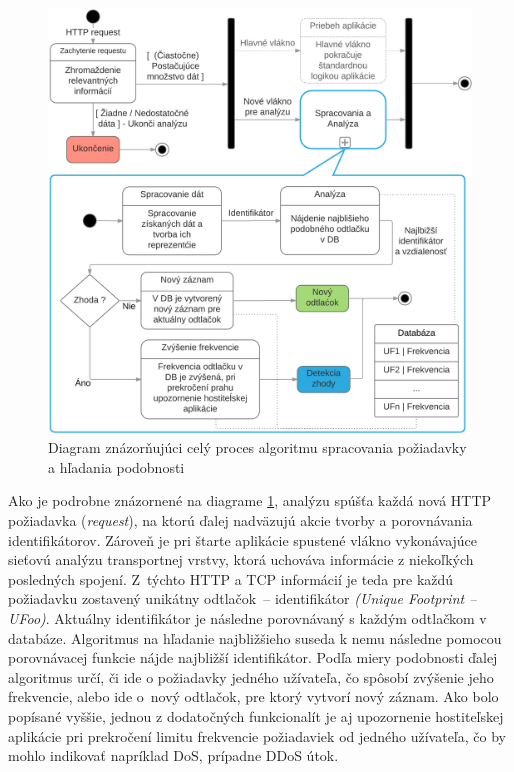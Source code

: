\documentclass[
  digital, %
  oneside, %
  table,   %
  lof,     %
  nolot,   %
  nocover
]{fithesis3}
\begin{document}
\begin{figure}[h]
  \centering
    \includegraphics[width=.93\textwidth]{images/footprint-hl.png}
  \caption{Diagram znázorňujúci celý proces algoritmu spracovania požiadavky a
  hľadania podobnosti}
  \label{fig:footprint-hl}
\end{figure}

Ako je podrobne znázornené na diagrame \ref{fig:footprint-hl}, analýzu spúšťa každá nová
HTTP požiadavka (\textit{request}), na ktorú ďalej nadväzujú akcie tvorby a porovnávania
identifikátorov. Zároveň je pri štarte aplikácie spustené vlákno vykonávajúce
sieťovú analýzu transportnej vrstvy, ktorá uchováva informácie z niekoľkých
posledných spojení. Z~týchto HTTP a TCP informácií je teda pre každú požiadavku
zostavený unikátny odtlačok~-- identifikátor \textit{(Unique Footprint -- UFoo)}.
Aktuálny identifikátor je následne porovnávaný s každým odtlačkom v databáze.
Algoritmus na hľadanie najbližšieho suseda k nemu následne pomocou porovnávacej
funkcie nájde najbližší identifikátor. Podľa miery podobnosti ďalej
algoritmus určí, či ide o požiadavky jedného užívateľa, čo spôsobí zvýšenie jeho
frekvencie, alebo ide o~nový odtlačok, pre ktorý vytvorí nový záznam.
Ako bolo popísané vyššie, jednou z dodatočných funkcionalít je aj upozornenie hostiteľskej aplikácie pri
prekročení limitu frekvencie požiadaviek od jedného užívateľa, čo by mohlo
indikovať napríklad DoS, prípadne DDoS útok.
\end{document}
